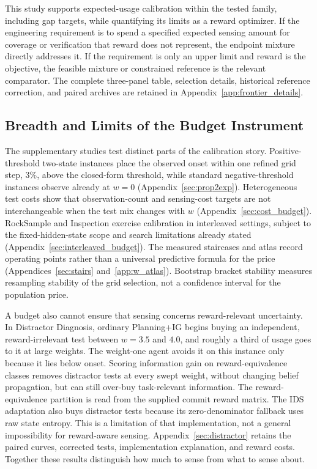 This study supports expected-usage calibration within the tested family, including gap targets, while quantifying its limits as a reward optimizer. If the engineering requirement is to spend a specified expected sensing amount for coverage or verification that reward does not represent, the endpoint mixture directly addresses it. If the requirement is only an upper limit and reward is the objective, the feasible mixture or constrained reference is the relevant comparator. The complete three-panel table, selection details, historical reference correction, and paired archives are retained in Appendix~\ref{app:frontier_details}.

\subsection{Breadth and Limits of the Budget Instrument}
\label{sec:budget_breadth_summary}

The supplementary studies test distinct parts of the calibration story. Positive-threshold two-state instances place the observed onset within one refined grid step, $3\%$, above the closed-form threshold, while standard negative-threshold instances observe already at $w{=}0$ (Appendix~\ref{sec:prop2exp}). Heterogeneous test costs show that observation-count and sensing-cost targets are not interchangeable when the test mix changes with $w$ (Appendix~\ref{sec:cost_budget}). RockSample and Inspection exercise calibration in interleaved settings, subject to the fixed-hidden-state scope and search limitations already stated (Appendix~\ref{sec:interleaved_budget}). The measured staircases and atlas record operating points rather than a universal predictive formula for the price (Appendices~\ref{sec:stairs} and~\ref{app:w_atlas}). Bootstrap bracket stability measures resampling stability of the grid selection, not a confidence interval for the population price.

A budget also cannot ensure that sensing concerns reward-relevant uncertainty. In Distractor Diagnosis, ordinary Planning+IG begins buying an independent, reward-irrelevant test between $w{=}3.5$ and $4.0$, and roughly a third of usage goes to it at large weights. The weight-one agent avoids it on this instance only because it lies below onset. Scoring information gain on reward-equivalence classes removes distractor tests at every swept weight, without changing belief propagation, but can still over-buy task-relevant information. The reward-equivalence partition is read from the supplied commit reward matrix. The IDS adaptation also buys distractor tests because its zero-denominator fallback uses raw state entropy. This is a limitation of that implementation, not a general impossibility for reward-aware sensing. Appendix~\ref{sec:distractor} retains the paired curves, corrected tests, implementation explanation, and reward costs. Together these results distinguish how much to sense from what to sense about.

